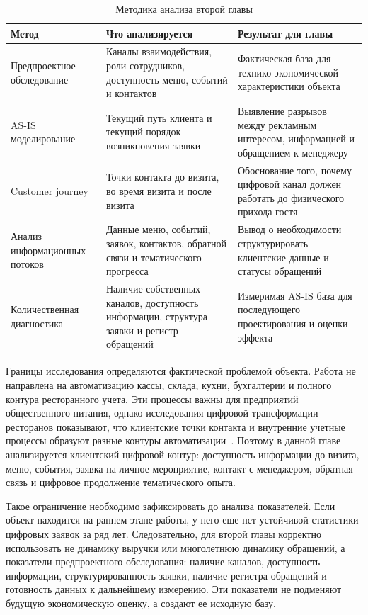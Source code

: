 \begin{table}[H]
\centering
\small
\caption{Методика анализа второй главы}
\label{tab:ch2_analysis_methods}
\begin{tabularx}{\textwidth}{|>{\raggedright\arraybackslash}p{}|>{\raggedright\arraybackslash}p{}|>{\raggedright\arraybackslash}X|}
\hline
\textbf{Метод} & \textbf{Что анализируется} & \textbf{Результат для главы} \\ \hline
Предпроектное обследование & Каналы взаимодействия, роли сотрудников, доступность меню, событий и контактов & Фактическая база для технико-экономической характеристики объекта \\ \hline
AS-IS моделирование & Текущий путь клиента и текущий порядок возникновения заявки & Выявление разрывов между рекламным интересом, информацией и обращением к менеджеру \\ \hline
Customer journey & Точки контакта до визита, во время визита и после визита & Обоснование того, почему цифровой канал должен работать до физического прихода гостя \\ \hline
Анализ информационных потоков & Данные меню, событий, заявок, контактов, обратной связи и тематического прогресса & Вывод о необходимости структурировать клиентские данные и статусы обращений \\ \hline
Количественная диагностика & Наличие собственных каналов, доступность информации, структура заявки и регистр обращений & Измеримая AS-IS база для последующего проектирования и оценки эффекта \\ \hline
\end{tabularx}
\normalsize
\end{table}

Границы исследования определяются фактической проблемой объекта. Работа не направлена на автоматизацию кассы, склада, кухни, бухгалтерии и полного контура ресторанного учета. Эти процессы важны для предприятий общественного питания, однако исследования цифровой трансформации ресторанов показывают, что клиентские точки контакта и внутренние учетные процессы образуют разные контуры автоматизации~\cite{alt2021,kandalenkova2023}. Поэтому в данной главе анализируется клиентский цифровой контур: доступность информации до визита, меню, события, заявка на личное мероприятие, контакт с менеджером, обратная связь и цифровое продолжение тематического опыта.

Такое ограничение необходимо зафиксировать до анализа показателей. Если объект находится на раннем этапе работы, у него еще нет устойчивой статистики цифровых заявок за ряд лет. Следовательно, для второй главы корректно использовать не динамику выручки или многолетнюю динамику обращений, а показатели предпроектного обследования: наличие каналов, доступность информации, структурированность заявки, наличие регистра обращений и готовность данных к дальнейшему измерению. Эти показатели не подменяют будущую экономическую оценку, а создают ее исходную базу.


